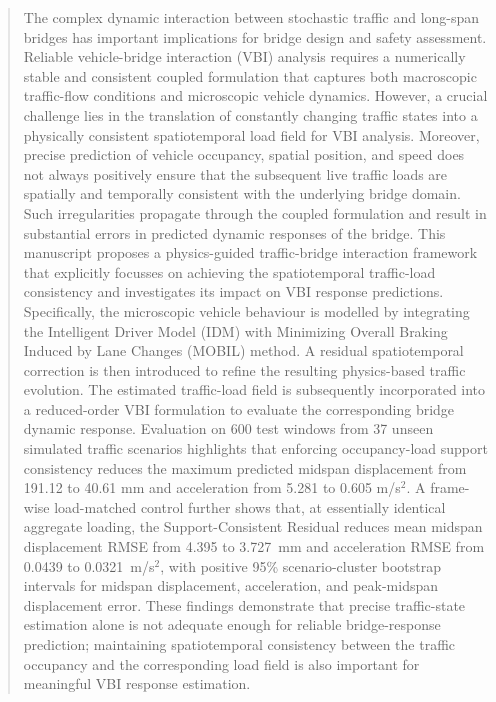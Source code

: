 \documentclass[journal]{IEEEtran}
\begin{document}
\begin{abstract}
The complex dynamic interaction between stochastic traffic and long-span bridges has important implications for bridge design and safety assessment. Reliable vehicle-bridge interaction (VBI) analysis requires a numerically stable and consistent coupled formulation that captures both macroscopic traffic-flow conditions and microscopic vehicle dynamics. However, a crucial challenge lies in the translation of constantly changing traffic states into a physically consistent spatiotemporal load field for VBI analysis. Moreover, precise prediction of vehicle occupancy, spatial position, and speed does not always positively ensure that the subsequent live traffic loads are spatially and temporally consistent with the underlying bridge domain. Such irregularities propagate through the coupled formulation and result in substantial errors in predicted dynamic responses of the bridge. This manuscript proposes a physics-guided traffic-bridge interaction framework that explicitly focusses on achieving the spatiotemporal traffic-load consistency and investigates its impact on VBI response predictions. Specifically, the microscopic vehicle behaviour is modelled by integrating the Intelligent Driver Model (IDM) with Minimizing Overall Braking Induced by Lane Changes (MOBIL) method. A residual spatiotemporal correction is then introduced to refine the resulting physics-based traffic evolution. The estimated traffic-load field is subsequently incorporated into a reduced-order VBI formulation to evaluate the corresponding bridge dynamic response. Evaluation on 600 test windows from 37 unseen simulated traffic scenarios highlights that enforcing occupancy-load support consistency reduces the maximum predicted midspan displacement from 191.12 to 40.61 mm and acceleration from 5.281 to 0.605 m/s$^2$. {\color{blue}A frame-wise load-matched control further shows that, at essentially identical aggregate loading, the Support-Consistent Residual reduces mean midspan displacement RMSE from 4.395 to 3.727~mm and acceleration RMSE from 0.0439 to 0.0321~m/s$^2$, with positive 95\% scenario-cluster bootstrap intervals for midspan displacement, acceleration, and peak-midspan displacement error.} These findings demonstrate that precise traffic-state estimation alone is not adequate enough for reliable bridge-response prediction; maintaining spatiotemporal consistency between the traffic occupancy and the corresponding load field is also important for meaningful VBI response estimation.
\end{abstract}
\end{document}
